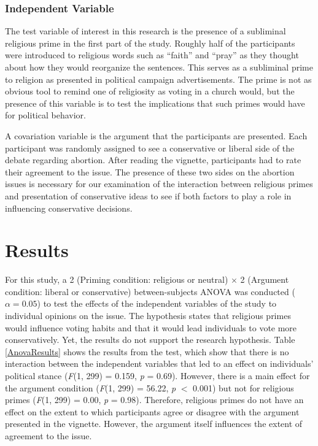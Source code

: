 \documentclass[letterpaper,man,natbib,noextraspace,12pt]{apa6}  %
\newcommand\e{\emph}
\begin{document}
\subsubsection{Independent Variable}

The test variable of interest in this research is the presence of a subliminal religious prime in the first part of the study. Roughly half of the participants were introduced to religious words such as “faith” and “pray” as they thought about how they would reorganize the sentences. This serves as a subliminal prime to religion as presented in political campaign advertisements. The prime is not as obvious tool to remind one of religiosity as voting in a church would, but the presence of this variable is to test the implications that such primes would have for political behavior.

A covariation variable is the argument that the participants are presented. Each participant was randomly assigned to see a conservative or liberal side of the debate regarding abortion. After reading the vignette, participants had to rate their agreement to the issue. The presence of these two sides on the abortion issues is necessary for our examination of the interaction between religious primes and presentation of conservative ideas to see if both factors to play a role in influencing conservative decisions.

\section{Results}

For this study, a 2 (Priming condition: religious or neutral) $\times$ 2 (Argument condition: liberal or conservative) between-subjects ANOVA was conducted ($\alpha = 0.05$) to test the effects of the independent variables of the study to individual opinions on the issue. The hypothesis states that religious primes would influence voting habits and that it would lead individuals to vote more conservatively. Yet, the results do not support the research hypothesis. Table \ref{AnovaResults} shows the results from the test, which show that there is no interaction between the independent variables that led to an effect on individuals' political stance (\e{F}(1, 299) = 0.159, \e{p} = 0.69). However, there is a main effect for the argument condition (\e{F}(1, 299) = 56.22, \e{p} $<$ 0.001) but not for religious primes (\e{F}(1, 299) = 0.00, \e{p} = 0.98). Therefore, religious primes do not have an effect on the extent to which participants agree or disagree with the argument presented in the vignette. However, the argument itself influences the extent of agreement to the issue. 
\end{document}
